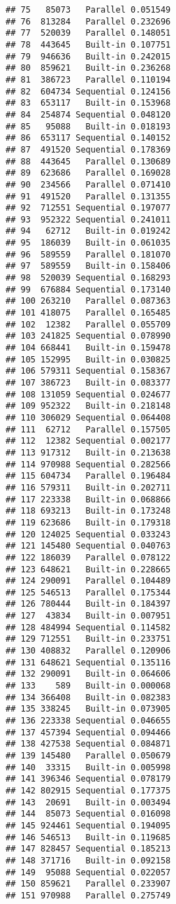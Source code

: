 \documentclass[
]{article}
\begin{document}
\begin{verbatim}
## 75   85073   Parallel 0.051549
## 76  813284   Parallel 0.232696
## 77  520039   Parallel 0.148051
## 78  443645   Built-in 0.107751
## 79  946636   Built-in 0.242015
## 80  859621   Built-in 0.236268
## 81  386723   Parallel 0.110194
## 82  604734 Sequential 0.124156
## 83  653117   Built-in 0.153968
## 84  254874 Sequential 0.048120
## 85   95088   Built-in 0.018193
## 86  653117 Sequential 0.140152
## 87  491520 Sequential 0.178369
## 88  443645   Parallel 0.130689
## 89  623686   Parallel 0.169028
## 90  234566   Parallel 0.071410
## 91  491520   Parallel 0.131355
## 92  712551 Sequential 0.197077
## 93  952322 Sequential 0.241011
## 94   62712   Built-in 0.019242
## 95  186039   Built-in 0.061035
## 96  589559   Parallel 0.181070
## 97  589559   Built-in 0.158406
## 98  520039 Sequential 0.168293
## 99  676884 Sequential 0.173140
## 100 263210   Parallel 0.087363
## 101 418075   Parallel 0.165485
## 102  12382   Parallel 0.055709
## 103 241825 Sequential 0.078990
## 104 668441   Built-in 0.159478
## 105 152995   Built-in 0.030825
## 106 579311 Sequential 0.158367
## 107 386723   Built-in 0.083377
## 108 131059 Sequential 0.024677
## 109 952322   Built-in 0.218148
## 110 306029 Sequential 0.064408
## 111  62712   Parallel 0.157505
## 112  12382 Sequential 0.002177
## 113 917312   Built-in 0.213638
## 114 970988 Sequential 0.282566
## 115 604734   Parallel 0.196484
## 116 579311   Built-in 0.202711
## 117 223338   Built-in 0.068866
## 118 693213   Built-in 0.173248
## 119 623686   Built-in 0.179318
## 120 124025 Sequential 0.033243
## 121 145480 Sequential 0.040763
## 122 186039   Parallel 0.078122
## 123 648621   Built-in 0.228665
## 124 290091   Parallel 0.104489
## 125 546513   Parallel 0.175344
## 126 780444   Built-in 0.184397
## 127  43834   Built-in 0.007951
## 128 484994 Sequential 0.114582
## 129 712551   Built-in 0.233751
## 130 408832   Parallel 0.120906
## 131 648621 Sequential 0.135116
## 132 290091   Built-in 0.064606
## 133    589   Built-in 0.000068
## 134 366408   Built-in 0.082383
## 135 338245   Built-in 0.073905
## 136 223338 Sequential 0.046655
## 137 457394 Sequential 0.094466
## 138 427538 Sequential 0.084871
## 139 145480   Parallel 0.050679
## 140  33315   Built-in 0.005998
## 141 396346 Sequential 0.078179
## 142 802915 Sequential 0.177375
## 143  20691   Built-in 0.003494
## 144  85073 Sequential 0.016098
## 145 924461 Sequential 0.194095
## 146 546513   Built-in 0.119685
## 147 828457 Sequential 0.185213
## 148 371716   Built-in 0.092158
## 149  95088 Sequential 0.022057
## 150 859621   Parallel 0.233907
## 151 970988   Parallel 0.275749

\end{verbatim}
\end{document}
